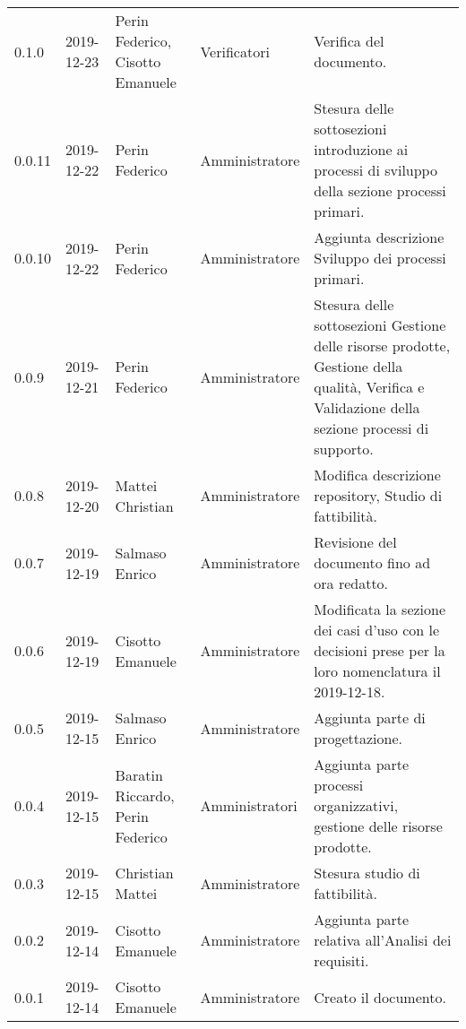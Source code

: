 {\begin{longtable}{C{2cm} C{2cm}  C{3cm}  C{3cm} C{4.5cm}}
0.1.0 & 2019-12-23 & Perin Federico, Cisotto Emanuele & Verificatori & Verifica del documento. \\

0.0.11 & 2019-12-22 & Perin Federico & Amministratore & Stesura delle sottosezioni introduzione ai processi di sviluppo della sezione processi primari. \\

0.0.10 & 2019-12-22 & Perin Federico  & Amministratore & Aggiunta descrizione Sviluppo dei processi primari. \\

0.0.9 & 2019-12-21 & Perin Federico & Amministratore & Stesura delle sottosezioni Gestione delle risorse prodotte, Gestione della qualità, Verifica e Validazione della sezione processi di supporto. \\

0.0.8 & 2019-12-20 & Mattei Christian & Amministratore & Modifica descrizione repository, Studio di fattibilità. \\

0.0.7 & 2019-12-19 & Salmaso Enrico & Amministratore & Revisione del documento fino ad ora redatto. \\

0.0.6 & 2019-12-19 & Cisotto Emanuele & Amministratore & Modificata la sezione dei casi d’uso con le decisioni prese per la loro nomenclatura il 2019-12-18. \\

0.0.5 & 2019-12-15 & Salmaso Enrico & Amministratore & Aggiunta parte di progettazione. \\

0.0.4 & 2019-12-15 & Baratin Riccardo, Perin Federico  & Amministratori & Aggiunta parte processi organizzativi, gestione delle risorse prodotte. \\

0.0.3 & 2019-12-15 & Christian Mattei & Amministratore & Stesura studio di fattibilità. \\

0.0.2 & 2019-12-14 & Cisotto Emanuele & Amministratore & Aggiunta parte relativa all’Analisi dei requisiti. \\

0.0.1 & 2019-12-14 & Cisotto Emanuele & Amministratore & Creato il documento. \\
		
\end{longtable}
}